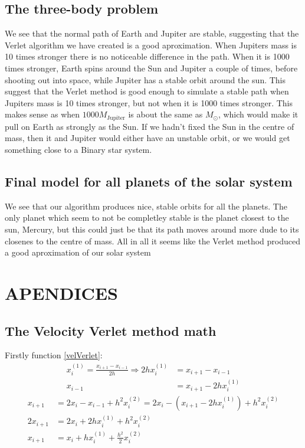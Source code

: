 \documentclass[a4paper]{article}
\begin{document}
\subsection{The three-body problem}
We see that the normal path of Earth and Jupiter are stable, suggesting that the Verlet algorithm we have created is a good aproximation. When Jupiters mass is 10 times stronger there is no noticeable difference in the path. When it is 1000 times stronger, Earth spins around the Sun and Jupiter a couple of times, before shooting out into space, while Jupiter has a stable orbit around the sun. This suggest that the Verlet method is good enough to simulate a stable path when Jupiters mass is 10 times stronger, but not when it is 1000 times stronger. This makes sense as when $1000M_{\text{Jupiter}}$ is about the same as $M_{\odot}$, which would make it pull on Earth as strongly as the Sun. If we hadn't fixed the Sun in the centre of mass, then it and Jupiter would either have an unstable orbit, or we would get something close to a Binary star system.

\subsection{Final model for all planets of the solar system}
We see that our algorithm produces nice, stable orbits for all the planets. The only planet which seem to not be completley stable is the planet closest to the sun, Mercury, but this could just be that its path moves around more dude to its closenes to the centre of mass. All in all it seems like the Verlet method produced a good aproximation of our solar system

\section{APENDICES}

\subsection{The Velocity Verlet method math}\label{vVerlet_math}

Firstly function \ref{velVerlet}:
\begin{align}
x_i^{(1)} = \frac{x_{i+1} - x_{i-1}}{2h} \Rightarrow 2hx_i^{(1)} &= x_{i+1} - x_{i-1} \\
x_{i-1} &= x_{i+1} - 2hx_i^{(1)}
\end{align}
\begin{align}
x_{i+1} &= 2x_i - x_{i-1} + h^2 x_i^{(2)} = 2x_i - \left( x_{i+1} - 2hx_i^{(1)} \right)  + h^2 x_i^{(2)} \\
2 x_{i+1} &= 2x_i + 2hx_i^{(1)} + h^2 x_i^{(2)} \\
x_{i+1} &= x_i + hx_i^{(1)} + \frac{h^2}{2} x_i^{(2)} 
\end{align}
\end{document}

